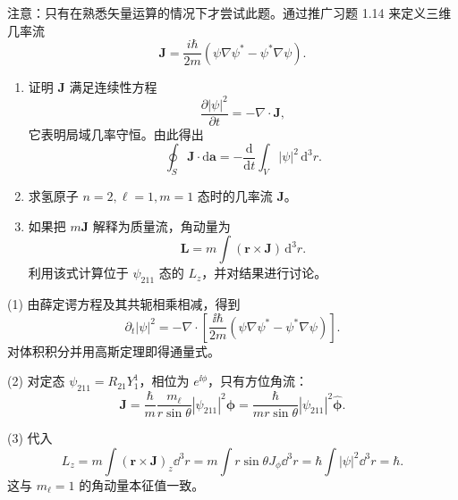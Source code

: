 \begin{question}
注意：只有在熟悉矢量运算的情况下才尝试此题。通过推广习题 1.14 来定义三维几率流
\[
\mathbf J=\frac{i\hbar}{2m}(\psi\nabla\psi^*-\psi^*\nabla\psi).
\]
\begin{enumerate}
\item 证明 $\mathbf J$ 满足连续性方程
\[
\frac{\partial |\psi|^2}{\partial t}=-\nabla\cdot\mathbf J,
\]
它表明局域几率守恒。由此得出
\[
\oint_S \mathbf J\cdot\mathrm d\mathbf a=-\frac{\mathrm d}{\mathrm dt}\int_V |\psi|^2\,\mathrm d^3r.
\]
\item 求氢原子 $n=2,\ell=1,m=1$ 态时的几率流 $\mathbf J$。
\item 如果把 $m\mathbf J$ 解释为质量流，角动量为
\[
\mathbf L=m\int (\mathbf r\times\mathbf J)\,\mathrm d^3r.
\]
利用该式计算位于 $\psi_{211}$ 态的 $L_z$，并对结果进行讨论。
\end{enumerate}
\end{question}
\begin{solution}

(1) 由薛定谔方程及其共轭相乘相减，得到
\[
\partial_t|\psi|^2=-\nabla\cdot\left[\frac{\ii\hbar}{2m}(\psi\nabla\psi^*-\psi^*\nabla\psi)\right].
\]
对体积积分并用高斯定理即得通量式。

(2) 对定态 $\psi_{211}=R_{21}Y_1^1$，相位为 $e^{\ii\phi}$，只有方位角流：
\[
\mathbf J=\frac{\hbar}{m}\frac{m_\ell}{r\sin\theta}|\psi_{211}|^2\hat{\boldsymbol\phi}
=\frac{\hbar}{mr\sin\theta}|\psi_{211}|^2\hat{\boldsymbol\phi}.
\]

(3) 代入
\[
L_z=m\int (\mathbf r\times\mathbf J)_z\dd^3r
=m\int r\sin\theta J_\phi\dd^3r
=\hbar\int|\psi|^2\dd^3r=\hbar.
\]
这与 $m_\ell=1$ 的角动量本征值一致。

\end{solution}

